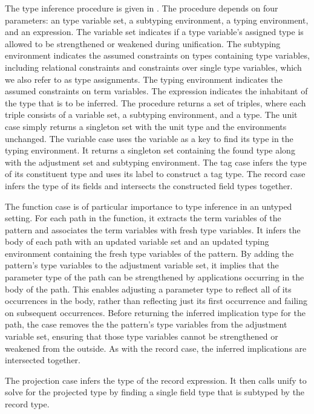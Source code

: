\documentclass[acmsmall]{acmart}
\theoremstyle{definition}
\begin{document}
The type inference procedure is given in .
The procedure depends on four parameters: an type variable set, a subtyping environment, 
a typing environment, and an expression.
The variable set indicates if a type variable's assigned type is allowed to be strengthened or weakened  
during unification.
The subtyping environment indicates the assumed constraints on types containing type variables,
including relational constraints and constraints over single type variables, 
which we also refer to as type assignments.
The typing environment indicates the assumed constraints on term variables.
The expression indicates the inhabitant of the type that is to be inferred.
The procedure returns a set of triples, where each triple consists of a variable set, a subtyping environment,
and a type.
The unit case simply returns a singleton set with the unit type and the environments unchanged. 
The variable case uses the variable as a key to find its type in the typing environment. 
It returns a singleton set containing the found type along with the adjustment set and subtyping environment.
The tag case infers the type of its constituent type and uses its label to construct a tag type.
The record case infers the type of its fields and intersects the constructed field types together.

The function case is of particular importance to type inference in an untyped setting.
For each path in the function, it extracts the term variables of the pattern and associates 
the term variables with fresh type variables. It infers the body of each path 
with an updated variable set and an updated typing environment containing the fresh
type variables of the pattern. By adding the pattern's type variables to the adjustment variable set,
it implies that the parameter type of the path can be strengthened by applications
occurring in the body of the path. This enables adjusting a parameter type to reflect all of its 
occurrences in the body, 
rather than reflecting just its first occurrence and failing on subsequent occurrences. 
Before returning the inferred implication type for the path, the case removes
the the pattern's type variables from the adjustment variable set, ensuring
that those type variables cannot be strengthened or weakened from the outside. 
As with the record case, the inferred implications are intersected together.

The projection case infers the type of the record expression. 
It then calls unify to solve for the projected type by finding
a single field type that is subtyped by the record type. 
\end{document}
